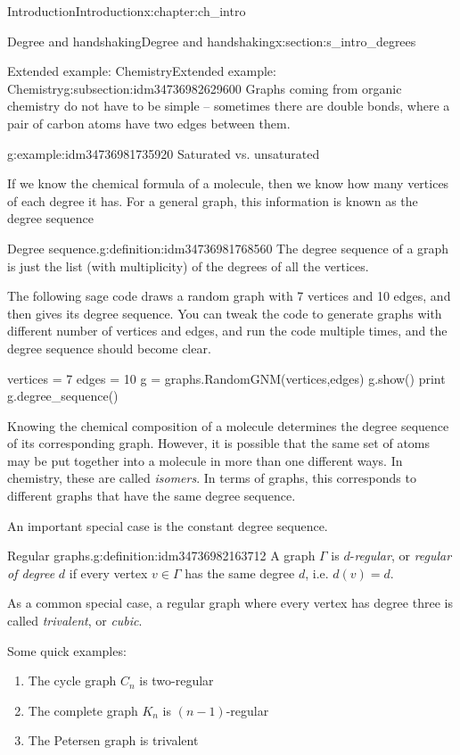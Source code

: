 \documentclass[oneside,10pt,]{book}
\numberwithin{equation}{section}
\begin{document}
\begin{chapterptx}{Introduction}{}{Introduction}{}{}{x:chapter:ch_intro}
\begin{sectionptx}{Degree and handshaking}{}{Degree and handshaking}{}{}{x:section:s_intro_degrees}
\begin{subsectionptx}{Extended example: Chemistry}{}{Extended example: Chemistry}{}{}{g:subsection:idm34736982629600}
Graphs coming from organic chemistry do not have to be simple – sometimes there are double bonds, where a pair of carbon atoms have two edges between them.%
\begin{example}{}{g:example:idm34736981735920}%
Saturated vs. unsaturated\end{example}
If we know the chemical formula of a molecule, then we know how many vertices of each degree it has.  For a general graph, this information is known as the degree sequence%
\begin{definition}{Degree sequence.}{g:definition:idm34736981768560}%
The degree sequence of a graph is just the list (with multiplicity) of the degrees of all the vertices.%
\end{definition}
The following sage code draws a random graph with 7 vertices and 10 edges, and then gives its degree sequence.  You can tweak the code to generate graphs with different number of vertices and edges, and run the code multiple times, and the degree sequence should become clear.%
\begin{sageinput}
vertices = 7
edges = 10
g = graphs.RandomGNM(vertices,edges)
g.show()
print g.degree_sequence()
\end{sageinput}
Knowing the chemical composition of a molecule determines the degree sequence of its corresponding graph. However, it is possible that the same set of atoms may be put together into a molecule in more than one different ways. In chemistry, these are called \emph{isomers}.  In terms of graphs, this corresponds to different graphs that have the same degree sequence.%
\par
An important special case is the constant degree sequence.%
\begin{definition}{Regular graphs.}{g:definition:idm34736982163712}%
A graph \(\Gamma\) is \(d\)-\emph{regular}, or \emph{regular of degree} \(d\) if every vertex \(v\in\Gamma\) has the same degree \(d\), i.e. \(d(v)=d\).%
\end{definition}
As a common special case, a regular graph where every vertex has degree three is called \emph{trivalent}, or \emph{cubic}.%
\par
Some quick examples:%
\begin{enumerate}
\item{}The cycle graph \(C_n\) is two-regular%
\item{}The complete graph \(K_n\) is \((n-1)\)-regular%
\item{}The Petersen graph is trivalent%
\end{enumerate}

\end{subsectionptx}
\end{sectionptx}
\end{chapterptx}
\end{document}
